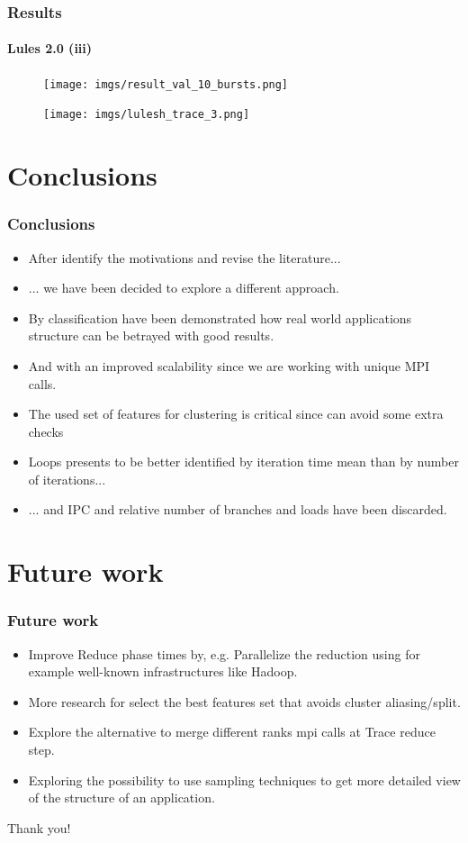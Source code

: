 \documentclass{beamer}
\begin{document}
\begin{frame}
	\frametitle{Results}
	\framesubtitle{Lules 2.0 (iii)}
	\begin{figure}
		\texttt{[image: imgs/result\_val\_10\_bursts.png]}
	\end{figure}
	\begin{figure}
		\texttt{[image: imgs/lulesh\_trace\_3.png]}
	\end{figure}
\end{frame}

\section{Conclusions}
\begin{frame}
\frametitle{Conclusions}
\begin{itemize}
	\item After identify the motivations and revise the literature...
	\item ... we have been decided to explore a different approach.
	\item By classification have been demonstrated how real world applications structure can be betrayed with good results.
	\item And with an improved scalability since we are working with unique MPI calls.
	\item The used set of features for clustering is critical since can avoid some extra checks
	\item Loops presents to be better identified by iteration time mean than by number of iterations...
	\item ... and IPC and relative number of branches and loads have been discarded.
\end{itemize}
\end{frame}

\section{Future work}
\begin{frame}
	\frametitle{Future work}
	\begin{itemize}
		\item Improve Reduce phase times by, e.g. Parallelize the reduction using for example well-known infrastructures like Hadoop.
		\item More research for select the best features set that avoids cluster aliasing/split.
		\item Explore the alternative to merge different ranks mpi calls at Trace reduce step.
		\item Exploring the possibility to use sampling techniques to get more detailed view of the structure of an application.
		
	\end{itemize}
\end{frame}

\begin{frame}
	\centering
	{\Huge Thank you!}
\end{frame}

%
%
\end{document}
